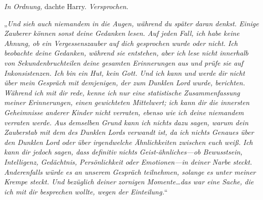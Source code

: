 \emph{In Ordnung,} dachte Harry. \emph{Versprochen}.

„\emph{Und sieh auch niemandem in die Augen, während du später daran denkst. Einige Zauberer können sonst deine Gedanken lesen. Auf jeden Fall, ich habe keine Ahnung, ob ein Vergessenszauber auf dich gesprochen wurde oder nicht. Ich beobachte deine Gedanken, während sie entstehen, aber ich lese nicht innerhalb von Sekundenbruchteilen deine gesamten Erinnerungen aus und prüfe sie auf Inkonsistenzen. Ich bin ein Hut, kein Gott. Und ich kann und werde dir nicht über mein Gespräch mit demjenigen, der zum Dunklen Lord wurde, berichten. Während ich mit dir rede, \emph{kenne} ich nur eine statistische Zusammenfassung meiner Erinnerungen, einen gewichteten Mittelwert; ich \emph{kann} dir die innersten Geheimnisse anderer Kinder nicht verraten, ebenso wie ich deine niemandem verraten werde. Aus demselben Grund kann ich nichts dazu sagen, warum dein Zauberstab mit dem des Dunklen Lords verwandt ist, da ich nichts Genaues über den Dunklen Lord oder über irgendwelche Ähnlichkeiten zwischen euch weiß. Ich \emph{kann} dir jedoch sagen, dass definitiv nichts Geist-ähnliches—ob Bewusstsein, Intelligenz, Gedächtnis, Persönlichkeit oder Emotionen—in deiner Narbe steckt. Anderenfalls würde es an unserem Gespräch teilnehmen, solange es unter meiner Krempe steckt. Und bezüglich deiner zornigen Momente…das war eine Sache, die ich mit dir besprechen wollte, wegen der Einteilung.}“

